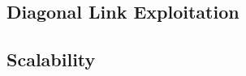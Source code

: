 \documentclass[sigconf, screen, review]{acmart}
\begin{document}
%


\subsection{Diagonal Link Exploitation}
\label{sec:results-diagonal}

%


\subsection{Scalability}
\label{sec:scalability}

%
\end{document}
